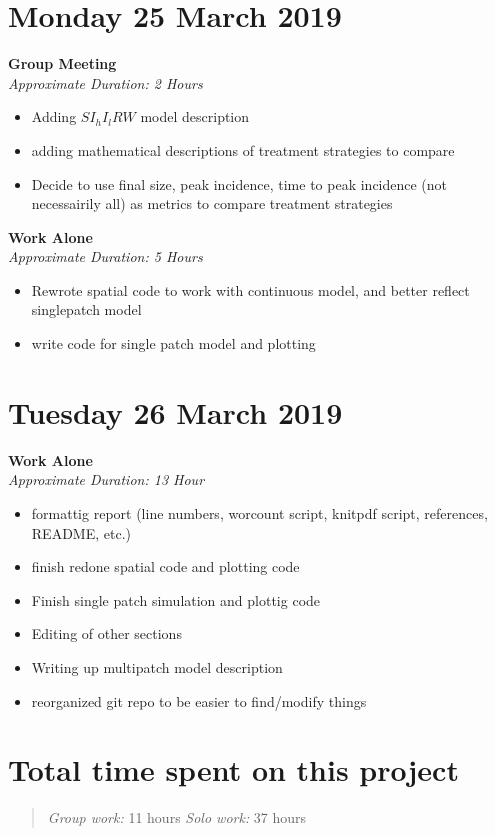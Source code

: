 \documentclass[12pt]{article}\usepackage[]{graphicx}\usepackage[]{color}
\begin{document}
\section*{Monday 25 March 2019}
\textbf{Group Meeting} \\
\emph{Approximate Duration: 2 Hours}
\begin{itemize}
    \item Adding $S I_h I_l R W$ model description
    \item adding mathematical descriptions of treatment strategies to compare
    \item Decide to use final size, peak incidence, time to peak incidence (not necessairily all) as metrics to compare treatment strategies
\end{itemize}
\textbf{Work Alone} \\
\emph{Approximate Duration: 5 Hours}
\begin{itemize}
    \item Rewrote spatial code to work with continuous model, and better reflect singlepatch model
    \item write code for single patch model and plotting
\end{itemize}
\section*{Tuesday 26 March 2019}
\textbf{Work Alone} \\
\emph{Approximate Duration: 13 Hour}
\begin{itemize}
    \item formattig report (line numbers, worcount script, knitpdf script, references, README, etc.)
    \item finish redone spatial code and plotting code
    \item Finish single patch simulation and plottig code
    \item Editing of other sections
    \item Writing up multipatch model description
    \item reorganized git repo to be easier to find/modify things
\end{itemize}
\section*{Total time spent on this project}
\begin{quote}
\emph{Group work:} 11 hours
\emph{Solo work:} 37 hours
\end{quote}
\end{document}
